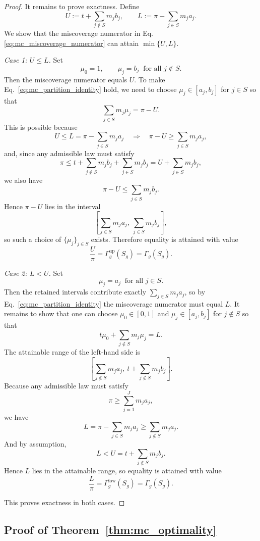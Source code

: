 \documentclass[11pt]{article}
\theoremstyle{statplain}
\theoremstyle{statdefinition}
\newcommand{\0}{\mathbf{0}}
\newcommand{\iteratorClass}{g}
\begin{document}
\begin{proof}
It remains to prove exactness.
Define
\[
U:=t+\sum_{j\notin S} m_j b_j,
\qquad
L:=\pi-\sum_{j\in S} m_j a_j.
\]
We show that the miscoverage numerator in Eq.~ \eqref{eq:mc_miscoverage_numerator} can attain $\min\{U,L\}$.

\emph{Case 1: $U\le L$.}
Set
\[
\mu_0=1,
\qquad
\mu_j=b_j \ \text{ for all } j\notin S.
\]
Then the miscoverage numerator equals $U$.
To make Eq.~\eqref{eq:mc_partition_identity} hold, we need to choose $\mu_j\in[a_j,b_j]$ for $j\in S$ so that
\[
\sum_{j\in S} m_j\mu_j=\pi-U.
\]
This is possible because
\[
U\le L=\pi-\sum_{j\in S} m_j a_j
\quad \Longrightarrow \quad
\pi-U\ge \sum_{j\in S} m_j a_j,
\]
and, since any admissible law must satisfy
\[
\pi
\le
t+\sum_{j\notin S} m_j b_j+\sum_{j\in S} m_j b_j
=
U+\sum_{j\in S} m_j b_j,
\]
we also have
\[
\pi-U\le \sum_{j\in S} m_j b_j.
\]
Hence $\pi-U$ lies in the interval
\[
\left[\sum_{j\in S} m_j a_j,\ \sum_{j\in S} m_j b_j\right],
\]
so such a choice of $\{\mu_j\}_{j\in S}$ exists.
Therefore equality is attained with value
\[
\frac{U}{\pi}
=
\Gamma_{\iteratorClass}^{\mathrm{up}}(S_\iteratorClass)
=
\Gamma_{\iteratorClass}(S_\iteratorClass).
\]

\emph{Case 2: $L<U$.}
Set
\[
\mu_j=a_j \ \text{ for all } j\in S.
\]
Then the retained intervals contribute exactly $\sum_{j\in S} m_j a_j$, so by Eq.~\eqref{eq:mc_partition_identity} the miscoverage numerator must equal $L$.
It remains to show that one can choose $\mu_0\in[0,1]$ and $\mu_j\in[a_j,b_j]$ for $j\notin S$ so that
\[
t\mu_0+\sum_{j\notin S} m_j\mu_j=L.
\]
The attainable range of the left-hand side is
\[
\left[\sum_{j\notin S} m_j a_j,\ t+\sum_{j\notin S} m_j b_j\right].
\]
Because any admissible law must satisfy
\[
\pi\ge \sum_{j=1}^{J} m_j a_j,
\]
we have
\[
L
=
\pi-\sum_{j\in S} m_j a_j
\ge
\sum_{j\notin S} m_j a_j.
\]
And by assumption,
\[
L<U=t+\sum_{j\notin S} m_j b_j.
\]
Hence $L$ lies in the attainable range, so equality is attained with value
\[
\frac{L}{\pi}
=
\Gamma_{\iteratorClass}^{\mathrm{low}}(S_\iteratorClass)
=
\Gamma_{\iteratorClass}(S_\iteratorClass).
\]

This proves exactness in both cases.
\end{proof}

\subsection{Proof of Theorem~\ref{thm:mc_optimality}}
\label{proof_thm:mc_optimality}
\end{document}
